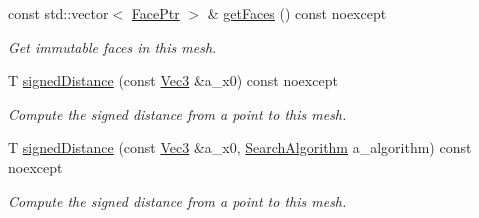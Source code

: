 \begin{DoxyCompactItemize}
\mbox{\label{classDcel_1_1MeshT_afe1bd52d15af160f691bdd83305c84c7}} 
const std\+::vector$<$ \hyperlink{classDcel_1_1MeshT_a6c71642a9e6b36f9d6ab6027035625f0}{Face\+Ptr} $>$ \& \hyperlink{classDcel_1_1MeshT_afe1bd52d15af160f691bdd83305c84c7}{get\+Faces} () const noexcept
\begin{DoxyCompactList}\small\item\em Get immutable faces in this mesh. \end{DoxyCompactList}\item 
T \hyperlink{classDcel_1_1MeshT_aa6f614aa0d93c3345c10150168347497}{signed\+Distance} (const \hyperlink{classDcel_1_1MeshT_a646c5d8f66b3079bca35fe4186493627}{Vec3} \&a\+\_\+x0) const noexcept
\begin{DoxyCompactList}\small\item\em Compute the signed distance from a point to this mesh. \end{DoxyCompactList}\item 
T \hyperlink{classDcel_1_1MeshT_a4fa40378fbd4c31cd50e77da70ef30fd}{signed\+Distance} (const \hyperlink{classDcel_1_1MeshT_a646c5d8f66b3079bca35fe4186493627}{Vec3} \&a\+\_\+x0, \hyperlink{classDcel_1_1MeshT_abb4c3bb7a52804bb041c133f30151399}{Search\+Algorithm} a\+\_\+algorithm) const noexcept
\begin{DoxyCompactList}\small\item\em Compute the signed distance from a point to this mesh. \end{DoxyCompactList}\end{DoxyCompactItemize}
